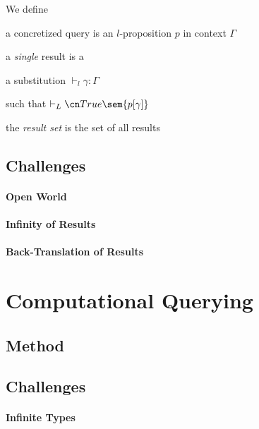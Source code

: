 We define
\begin{compactitem}
\item a concretized query is an $l$-proposition $p$ in context $\Gamma$
\item a \emph{single} result is a
 \begin{compactitem}
 \item a substitution $\vdash_l \gamma:\Gamma$
 \item such that $\vdash_L \truelift \sem{p[\gamma]}$
 \end{compactitem}
\item the \emph{result set} is the set of all results
\end{compactitem}

\subsection{Challenges}

\paragraph{Open World}

\paragraph{Infinity of Results}

\paragraph{Back-Translation of Results}


\section{Computational Querying}\label{sec:bolquery:comp}

\subsection{Method}

\subsection{Challenges}

\paragraph{Infinite Types}

